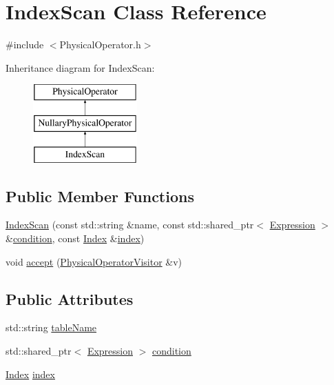\hypertarget{class_index_scan}{\section{Index\+Scan Class Reference}
\label{class_index_scan}
}


{\ttfamily \#include $<$Physical\+Operator.\+h$>$}

Inheritance diagram for Index\+Scan\+:\begin{figure}[H]
\begin{center}
\leavevmode
\includegraphics[height=3.000000cm]{class_index_scan}
\end{center}
\end{figure}
\subsection*{Public Member Functions}
\begin{DoxyCompactItemize}
\item 
\hyperlink{class_index_scan_a25eeb21a925a19209af7100de3f42ef5}{Index\+Scan} (const std\+::string \&name, const std\+::shared\+\_\+ptr$<$ \hyperlink{class_expression}{Expression} $>$ \&\hyperlink{class_index_scan_a9adcd1af97f3df02679f18fed687af21}{condition}, const \hyperlink{class_index}{Index} \&\hyperlink{class_index_scan_a8ffc3e0a33fb2db655471ea28e47bc9e}{index})
\item 
void \hyperlink{class_index_scan_a683950e9802678a2351f026ddb2a9881}{accept} (\hyperlink{class_physical_operator_visitor}{Physical\+Operator\+Visitor} \&v)
\end{DoxyCompactItemize}
\subsection*{Public Attributes}
\begin{DoxyCompactItemize}
\item 
std\+::string \hyperlink{class_index_scan_a8557a6ffee853f05298881acf8bebe14}{table\+Name}
\item 
std\+::shared\+\_\+ptr$<$ \hyperlink{class_expression}{Expression} $>$ \hyperlink{class_index_scan_a9adcd1af97f3df02679f18fed687af21}{condition}
\item 
\hyperlink{class_index}{Index} \hyperlink{class_index_scan_a8ffc3e0a33fb2db655471ea28e47bc9e}{index}
\end{DoxyCompactItemize}


